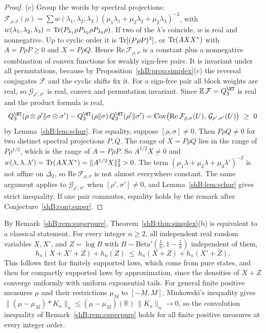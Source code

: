 \begin{proof}
(c) Group the words by spectral projections: $\mathcal F_{\rho,\sigma}(\mu)=\sum w(\lambda_1,\lambda_2,\lambda_3)(\mu_1\lambda_1+\mu_2\lambda_2+\mu_3\lambda_3)^{-2}$, with $w(\lambda_1,\lambda_2,\lambda_3)=\operatorname{Tr}(P_{\lambda_1}\rho P_{\lambda_2}\rho P_{\lambda_3}\rho)$. If two of the $\lambda$'s coincide, $w$ is real and nonnegative. Up to cyclic order it is $\operatorname{Tr}[(P\rho P)^3]$, or $\operatorname{Tr}(AXX^*)$ with $A=P\rho P\ge0$ and $X=P\rho Q$. Hence $\mathrm{Re}\,\mathcal F_{\rho,\sigma}$ is a constant plus a nonnegative combination of convex functions for weakly sign-free pairs. It is invariant under all permutations, because by Proposition~\ref{shB:prop:simplex}(c) the reversal conjugates $\mathcal F$ and the cyclic shifts fix it. For a sign-free pair all block weights are real, so $\mathcal G_{\rho',\sigma'}$ is real, convex and permutation invariant. Since $\mathbb E\,\mathcal F=Q^\HT_3$ is real and the product formula is real,
\[
Q^\HT_3(\rho\otimes\rho'\|\sigma\otimes\sigma')-Q^\HT_3(\rho\|\sigma)\,Q^\HT_3(\rho'\|\sigma')=\mathrm{Cov}\big(\mathrm{Re}\,\mathcal F_{\rho,\sigma}(U),\,\mathcal G_{\rho',\sigma'}(U)\big)\ \ge\ 0
\]
by Lemma~\ref{shB:lem:schur}. For equality, suppose $[\rho,\sigma]\ne0$. Then $P\rho Q\ne0$ for two distinct spectral projections $P,Q$. The range of $X=P\rho Q$ lies in the range of $P\rho^{1/2}$, which is the range of $A=P\rho P$. So $A^{1/2}X\ne0$ and $w(\lambda,\lambda,\lambda')=\operatorname{Tr}(AXX^*)=\|A^{1/2}X\|_2^2>0$. The term $(\mu_1\lambda+\mu_2\lambda+\mu_3\lambda')^{-2}$ is not affine on $\Delta_2$, so $\mathrm{Re}\,\mathcal F_{\rho,\sigma}$ is not almost everywhere constant. The same argument applies to $\mathcal G_{\rho',\sigma'}$ when $[\rho',\sigma']\ne0$, and Lemma~\ref{shB:lem:schur} gives strict inequality. If one pair commutes, equality holds by the remark after Conjecture~\ref{shB:conj:super}.
\end{proof}

By Remark~\ref{shB:rem:superpure}, Theorem~\ref{shB:thm:simplex}(b) is equivalent to a classical statement. For every integer $n\ge2$, all independent real random variables $X,X'$, and $Z=\log B$ with $B\sim\mathrm{Beta}'(\frac1n,1-\frac1n)$ independent of them,
\[
h_n(X+X'+Z)+h_n(Z)\ \le\ h_n(X+Z)+h_n(X'+Z).
\]
This follows first for finitely supported laws, which come from pure states, and then for compactly supported laws by approximation, since the densities of $X+Z$ converge uniformly with uniform exponential tails. For general finite positive measures $\mu$ and their restrictions $\mu_M$ to $[-M,M]$, Minkowski's inequality gives $\|(\mu-\mu_M)*K_n\|_n\le(\mu-\mu_M)(\mathbb R)\,\|K_n\|_n\to0$, so the convolution inequality of Remark~\ref{shB:rem:superpure} holds for all finite positive measures at every integer order.

